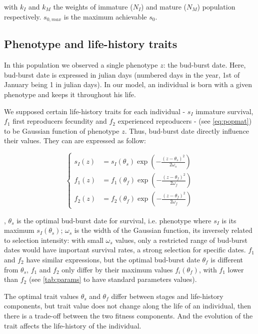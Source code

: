 with $k_{I}$ and $k_{M}$ the weights of immature ($N_{I}$) and mature ($N_{M}$) population respectively. $s_{0, max}$ is the maximum achievable $s_{0}$.

\subsection*{Phenotype and life-history traits}

In this population we observed a single phenotype $z$: the bud-burst date. Here, bud-burst date is expressed in julian days (numbered days in the year, 1st of January being 1 in julian days). In our model, an individual is born with a given phenotype and keeps it throughout his life.

We supposed certain life-history traits for each individual - $s_{I}$ immature survival, $f_1$ first reproducers fecundity and $f_2$ experienced reproducers - (see \autoref{eq:popmat}) to be Gaussian function of phenotype $z$. Thus, bud-burst date directly influence their values. They can are expressed as follow:

\begin{equation}
	\label{eq:indlht}
	\left\{
	\begin{aligned}
	s_{I}(z) &= s_{I}(\theta_{s})	\exp\left(-\frac{(z - \theta_{s})^2}{2\omega_{s}}\right) \\
	f_1(z) &= f_1(\theta_{f})	\exp\left(-\frac{(z - \theta_{f})^2}{2\omega_{f}}\right) \\
	f_2(z) &= f_2(\theta_{f})	\exp\left(-\frac{(z - \theta_{f})^2}{2\omega_{f}}\right)
	\end{aligned}
	\right.
\end{equation}


, $\theta_s$ is the optimal bud-burst date for survival, i.e. phenotype where $s_I$ is its maximum $s_I(\theta_s)$; $\omega_s$ is the width of the Gaussian function, its inversely related to selection intensity: with small $\omega_s$ values, only a restricted range of bud-burst dates would have important survival rates, a strong selection for specific dates. $f_1$ and $f_2$ have similar expressions, but the optimal bud-burst date $\theta_f$ is different from $\theta_s$, $f_1$ and $f_2$ only differ by their maximum values $f_i(\theta_f)$, with $f_1$ lower than $f_2$ (see \autoref{tab:params} to have standard parameters values).

The optimal trait values $\theta_s$ and $\theta_f$ differ between stages and life-history components, but trait value does not change along the life of an individual, then there is a trade-off between the two fitness components. And the evolution of the trait affects the life-history of the individual.


